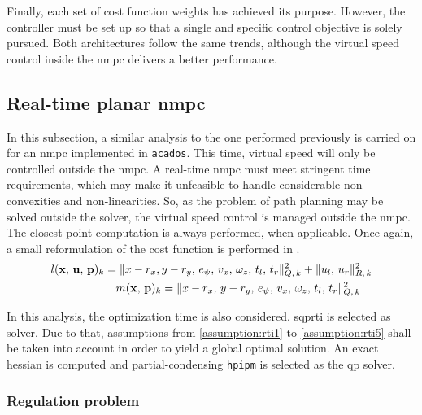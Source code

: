 Finally, each set of cost function weights has achieved its purpose. However, the controller must be set up so that a single and specific control objective is solely pursued. Both architectures follow the same trends, although the virtual speed control inside the \acrshort{nmpc} delivers a better performance.

\subsection{Real-time planar \acrshort{nmpc}}
\label{subsection:realTimeOneStagePlanarOCP}

In this subsection, a similar analysis to the one performed previously is carried on for an \acrshort{nmpc} implemented in \texttt{acados}. This time, virtual speed will only be controlled outside the \acrshort{nmpc}. A real-time \acrshort{nmpc} must meet stringent time requirements, which may make it unfeasible to handle considerable non-convexities and non-linearities. So, as the problem of path planning may be solved outside the solver, the virtual speed control is managed outside the \acrshort{nmpc}. The closest point computation is always performed, when applicable. Once again, a small reformulation of the cost function is performed in .
\begin{subequations}
	\begin{align}
		l(\mathbf{x},\,\mathbf{u},\,\mathbf{p})_k = \Vert x - r_{x},\,&y - r_{y},\,e_{\psi},\,v_{x},\,\omega_{z},\,t_{l},\,t_{r}\Vert_{Q,\,k}^2 + \Vert u_{l},\,u_{r} \Vert_{R,\,k}^2 \label{subeq:realtimeonestagelagrange}\\
		m(\mathbf{x},\,\mathbf{p})_k &= \Vert x - r_{x},\,y - r_{y},\,e_{\psi},\,v_{x},\,\omega_{z},\,t_{l},\,t_{r} \Vert_{Q,\,k}^2 \label{subeq:realtimeonestagemayer}
	\end{align}
	\label{eq:realtimeplanarocpcost}
\end{subequations}

In this analysis, the optimization time is also considered. \acrshort{sqprti} is selected as solver. Due to that, assumptions from \ref{assumption:rti1} to \ref{assumption:rti5} shall be taken into account in order to yield a global optimal solution. An exact hessian is computed and partial-condensing \texttt{\acrshort{hpipm}} is selected as the \acrshort{qp} solver.

\subsubsection*{Regulation problem}

